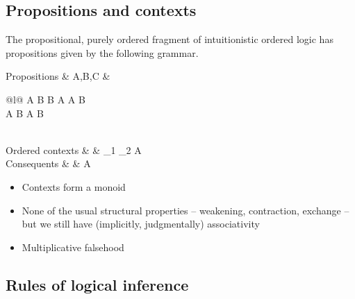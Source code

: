 \subsection{Propositions and contexts}

The propositional, purely ordered fragment of intuitionistic ordered logic has propositions given by the following grammar.
\begin{syntax*}
  Propositions &
    A,B,C & \begin{array}[t]{@{}l@{}}
              \alpha \mid A \limp B \mid B \pmir A
                \mid A \fuse B \mid \one \\
              \mathllap{\mid {}} A \with B \mid \top
                \mid A \plus B \mid \zero
            \end{array}
  \\
  Ordered contexts &
    \octx & \octxe \mid \octx_1 \oc \octx_2 \mid A
  \\
  Conseq\relax uents &
    \cseq & A \mid \octxe
\end{syntax*}

\begin{itemize}
\item Contexts form a monoid
\item None of the usual structural properties -- weakening, contraction, exchange -- but we still have (implicitly, judgmentally) associativity
\item Multiplicative falsehood
\end{itemize}

\subsection{Rules of logical inference}

